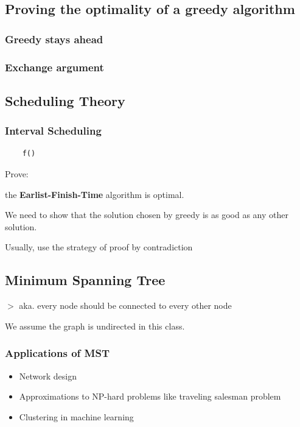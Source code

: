 \documentclass[12pt,a4paper]{article}
\newcommand{\remark}[1]{
    {\small $>$ {\color{blue} #1}}
}
\begin{document}
\subsection*{Proving the optimality of a greedy algorithm}

\subsubsection*{Greedy stays ahead}

\subsubsection*{Exchange argument}

\subsection*{Scheduling Theory}

\subsubsection{Interval Scheduling}

\begin{verbatim}
    f()
\end{verbatim}

Prove:

the \textbf{Earlist-Finish-Time} algorithm is optimal.

We need to show that the solution chosen by greedy is as good as any other solution.

Usually, use the strategy of proof by contradiction

\subsection*{Minimum Spanning Tree}

\remark{aka. every node should be connected to every other node}

We assume the graph is undirected in this class.

\subsubsection{Applications of MST}

\begin{itemize}
    \item Network design
    \item Approximations to NP-hard problems like traveling salesman problem
    \item Clustering in machine learning
\end{itemize}
\end{document}

